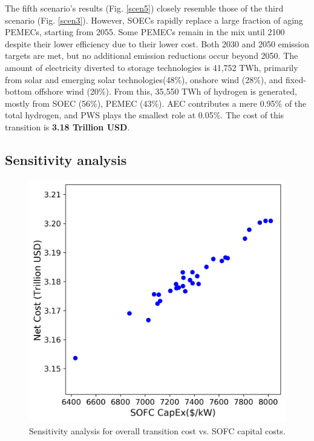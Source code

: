 The fifth scenario's results (Fig. \ref{scen5}) closely resemble those of the third scenario (Fig. \ref{scen3}). However, \gls{SOEC}s rapidly replace a large fraction of aging \gls{PEMEC}s, starting from 2055. Some \gls{PEMEC}s remain in the mix until 2100 despite their lower efficiency due to their lower cost. Both 2030 and 2050 emission targets are met, but no additional emission reductions occur beyond 2050. The amount of electricity diverted to storage technologies is 41,752 TWh, primarily from solar and emerging solar technologies(48\%), onshore wind (28\%), and fixed-bottom offshore wind (20\%). From this, 35,550 TWh of hydrogen is generated, mostly from \gls{SOEC} (56\%), \gls{PEMEC} (43\%). \gls{AEC} contributes a mere 0.95\% of the total hydrogen, and \gls{PWS} plays the smallest role at 0.05\%. The cost of this transition is \textbf{3.18 Trillion USD}.

\subsection{Sensitivity analysis}

\begin{figure}[H] 
\centering
\hspace*{-1cm}
\includegraphics[scale=0.7]{figures/syscost_abbrv}
\caption{Sensitivity analysis for overall transition cost vs. SOFC capital costs.}
\label{syscost-smol}
\end{figure}

